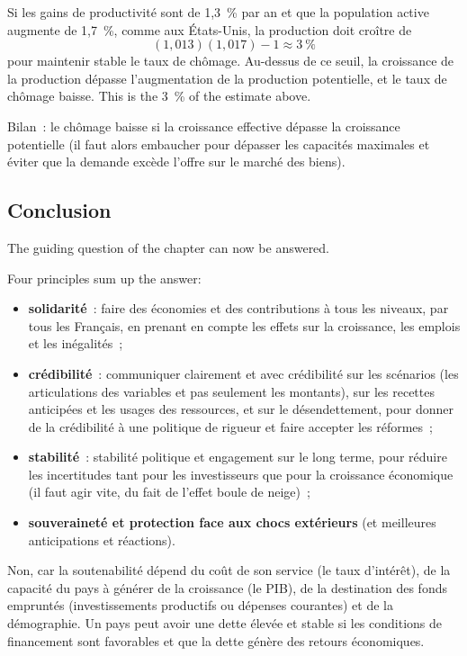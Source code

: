 \begin{example}
  Si les gains de productivité sont de 1,3~\% par an et que la population
  active augmente de 1,7~\%, comme aux États-Unis, la production doit croître de
  \[ (1{,}013)(1{,}017) - 1 \approx 3~\% \]
  pour maintenir stable le taux de chômage. Au-dessus de ce seuil, la croissance
  de la production dépasse l'augmentation de la production potentielle, et le
  taux de chômage baisse. This is the 3~\% of the estimate above.
\end{example}

Bilan~: le chômage baisse si la croissance effective dépasse la croissance
potentielle (il faut alors embaucher pour dépasser les capacités maximales et
éviter que la demande excède l'offre sur le marché des biens).

\subsection{Conclusion}

The guiding question of the chapter can now be answered.

\begin{example}
  Four principles sum up the answer:
  \begin{itemize}
    \item \textbf{solidarité}~: faire des économies et des contributions à tous
      les niveaux, par tous les Français, en prenant en compte les effets sur la
      croissance, les emplois et les inégalités~;
    \item \textbf{crédibilité}~: communiquer clairement et avec crédibilité sur
      les scénarios (les articulations des variables et pas seulement les
      montants), sur les recettes anticipées et les usages des ressources, et sur
      le désendettement, pour donner de la crédibilité à une politique de rigueur
      et faire accepter les réformes~;
    \item \textbf{stabilité}~: stabilité politique et engagement sur le long
      terme, pour réduire les incertitudes tant pour les investisseurs que pour
      la croissance économique (il faut agir vite, du fait de l'effet boule de
      neige)~;
    \item \textbf{souveraineté et protection face aux chocs extérieurs} (et
      meilleures anticipations et réactions).
  \end{itemize}
\end{example}

\begin{example}
  Non, car la soutenabilité dépend du coût de son service (le taux d'intérêt),
  de la capacité du pays à générer de la croissance (le PIB), de la destination
  des fonds empruntés (investissements productifs ou dépenses courantes) et de
  la démographie. Un pays peut avoir une dette élevée et stable si les
  conditions de financement sont favorables et que la dette génère des retours
  économiques.
\end{example}
